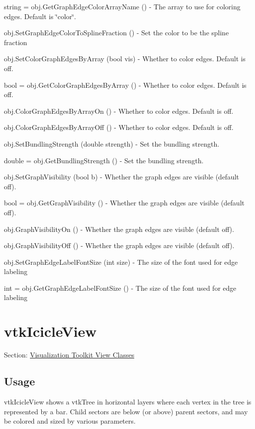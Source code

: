 \begin{DoxyItemize}
\item {\ttfamily string = obj.\-Get\-Graph\-Edge\-Color\-Array\-Name ()} -\/ The array to use for coloring edges. Default is \char`\"{}color\char`\"{}.  
\item {\ttfamily obj.\-Set\-Graph\-Edge\-Color\-To\-Spline\-Fraction ()} -\/ Set the color to be the spline fraction  
\item {\ttfamily obj.\-Set\-Color\-Graph\-Edges\-By\-Array (bool vis)} -\/ Whether to color edges. Default is off.  
\item {\ttfamily bool = obj.\-Get\-Color\-Graph\-Edges\-By\-Array ()} -\/ Whether to color edges. Default is off.  
\item {\ttfamily obj.\-Color\-Graph\-Edges\-By\-Array\-On ()} -\/ Whether to color edges. Default is off.  
\item {\ttfamily obj.\-Color\-Graph\-Edges\-By\-Array\-Off ()} -\/ Whether to color edges. Default is off.  
\item {\ttfamily obj.\-Set\-Bundling\-Strength (double strength)} -\/ Set the bundling strength.  
\item {\ttfamily double = obj.\-Get\-Bundling\-Strength ()} -\/ Set the bundling strength.  
\item {\ttfamily obj.\-Set\-Graph\-Visibility (bool b)} -\/ Whether the graph edges are visible (default off).  
\item {\ttfamily bool = obj.\-Get\-Graph\-Visibility ()} -\/ Whether the graph edges are visible (default off).  
\item {\ttfamily obj.\-Graph\-Visibility\-On ()} -\/ Whether the graph edges are visible (default off).  
\item {\ttfamily obj.\-Graph\-Visibility\-Off ()} -\/ Whether the graph edges are visible (default off).  
\item {\ttfamily obj.\-Set\-Graph\-Edge\-Label\-Font\-Size (int size)} -\/ The size of the font used for edge labeling  
\item {\ttfamily int = obj.\-Get\-Graph\-Edge\-Label\-Font\-Size ()} -\/ The size of the font used for edge labeling  
\end{DoxyItemize}\hypertarget{vtkviews_vtkicicleview}{}\section{vtk\-Icicle\-View}\label{vtkviews_vtkicicleview}
Section\-: \hyperlink{sec_vtkviews}{Visualization Toolkit View Classes} \hypertarget{vtkwidgets_vtkxyplotwidget_Usage}{}\subsection{Usage}\label{vtkwidgets_vtkxyplotwidget_Usage}
vtk\-Icicle\-View shows a vtk\-Tree in horizontal layers where each vertex in the tree is represented by a bar. Child sectors are below (or above) parent sectors, and may be colored and sized by various parameters.

